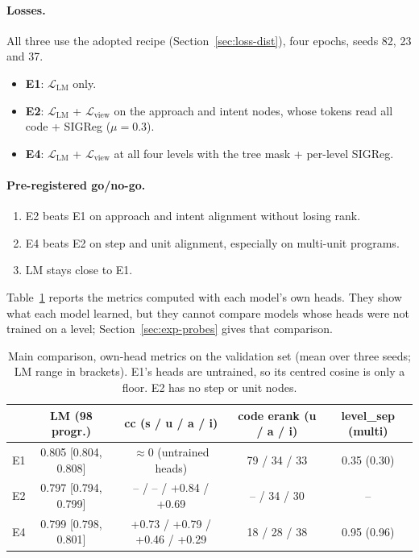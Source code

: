 \documentclass[11pt]{article}
\newcommand{\Lcal}{\mathcal{L}}
\begin{document}
\paragraph{Losses.} All three use the adopted recipe (Section~\ref{sec:loss-dist}), four epochs, seeds 82, 23
and 37.
\begin{itemize}
  \item \textbf{E1}: $\Lcal_{\text{LM}}$ only.
  \item \textbf{E2}: $\Lcal_{\text{LM}}$ + $\Lcal_{\text{view}}$ on the approach and intent nodes, whose tokens read all
        code + SIGReg ($\mu=0.3$).
  \item \textbf{E4}: $\Lcal_{\text{LM}}$ + $\Lcal_{\text{view}}$ at all four levels with the tree mask + per-level
        SIGReg.
\end{itemize}

\paragraph{Pre-registered go/no-go.}
\begin{enumerate}
  \item E2 beats E1 on approach and intent alignment without losing rank.
  \item E4 beats E2 on step and unit alignment, especially on multi-unit programs.
  \item LM stays close to E1.
\end{enumerate}

Table~\ref{tab:main} reports the metrics computed with each model's own heads. They show what each model learned,
but they cannot compare models whose heads were not trained on a level; Section~\ref{sec:exp-probes} gives that
comparison.

\begin{table}[t]
\centering
\small
\caption{Main comparison, own-head metrics on the validation set (mean over three seeds; LM range in brackets). E1's
heads are untrained, so its centred cosine is only a floor. E2 has no step or unit nodes.}
\label{tab:main}
\begin{tabular}{@{}l c c c c@{}}
\toprule
& LM (98 progr.) & cc (s / u / a / i) & code erank (u / a / i) & level\_sep (multi) \\
\midrule
E1 & 0.805 [0.804, 0.808] & $\approx 0$ (untrained heads) & 79 / 34 / 33 & 0.35 (0.30) \\
E2 & 0.797 [0.794, 0.799] & -- / -- / +0.84 / +0.69 & -- / 34 / 30 & -- \\
E4 & 0.799 [0.798, 0.801] & +0.73 / +0.79 / +0.46 / +0.29 & 18 / 28 / 38 & 0.95 (0.96) \\
\bottomrule
\end{tabular}
\end{table}
\end{document}

